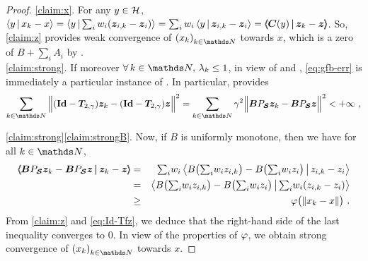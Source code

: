 \begin{proof}
\noindent\ref{claim:x}.
For any $y \in \mathcal{H}$, $\left\langle y\,\middle|\,x_k-x\right\rangle = \left\langle y\,\middle|\,\sum_i w_i(\boldsymbol z_{i,k}-\boldsymbol z_i)\right\rangle = \sum_i w_i \left\langle y\,\middle|\,\boldsymbol z_{i,k} - \boldsymbol z_i\right\rangle = \left<\kern-4.5pt\left< \boldsymbol C(y)\,\middle|\kern-2.5pt\middle|\,\boldsymbol z_k - \boldsymbol z \right>\kern-4.5pt\right>$. So, \ref{claim:z} provides weak convergence of $\pa{x_k}_{k \in \N}$ towards $x$, which is a zero of $B + \sum_i A_i$ by .\\


\noindent\ref{claim:strong}.
If moreover $\foralls k \in \N, \, \la_k \leq 1$, in view of  and , \eqref{eq:gfb-err} is immediately a particular instance of \cite[Algorithm 4.1]{Combettes04}. In particular, \cite[Theorem~3.1 and Remark~3.4]{Combettes04} provides
%
\begin{equation}\label{eq:Id-Tfz}
	\sum_{k \in \N} \normb{(\bId - \Tf) \bz_k - (\bId - \Tf) \bz}^2 =%
	\sum_{k \in \N} \ga^2 \normb{\bBJ \bz_k - \bBJ \bz}^2 < \pinfty~,
\end{equation} 
%

\ref{claim:strong}\ref{claim:strongB}.
Now, if $B$ is uniformly monotone, then we have for all $k \in \N$,
%
\begin{eqnarray*}
\left<\kern-4.5pt\left< \boldsymbol BP_{\boldsymbol {\mathcal{S}}} \boldsymbol z_k - \boldsymbol BP_{\boldsymbol {\mathcal{S}}} \boldsymbol z\,\middle|\kern-2.5pt\middle|\,\boldsymbol z_k - \boldsymbol z \right>\kern-4.5pt\right> 
	& = & {\textstyle \sum_{i}^{}} w_i \left\langle B \big(  {\textstyle \sum_{i}^{}} w_i z_{i,k}  \big) - B \big(  {\textstyle \sum_{i}^{}} w_i z_i \big)\,\middle|\,z_{i,k} - z_i\right\rangle \\
	& = & \left\langle B \big(  {\textstyle \sum_{i}^{}} w_i z_{i,k}  \big) - B \big(  {\textstyle \sum_{i}^{}} w_i z_i \big)\,\middle|\,{\textstyle \sum_{i}^{}} w_i (z_{i,k} - z_i)\right\rangle \\
	& \geq & \varphi \big(  |\kern-1pt| x_k - x |\kern-1pt|  \big)~.
\end{eqnarray*}
%
From \ref{claim:z} and \eqref{eq:Id-Tfz}, we deduce that the right-hand side of the last inequality converges to 0. In view of the properties of $\varphi$, we obtain strong convergence of $\pa{x_k}_{k\in\N}$ towards $x$.


\end{proof}

